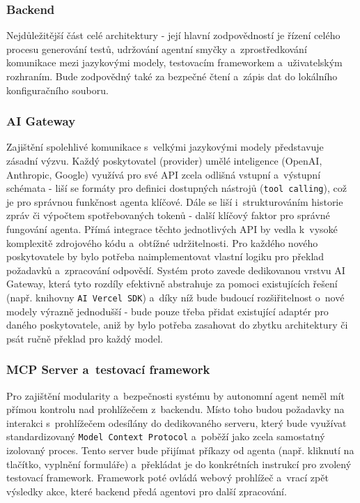 \documentclass[czech, ing, kiv, he, iso690numb, viewonly]{fasthesis}
\begin{document}
\subsubsection*{Backend}
Nejdůležitější část celé architektury - její hlavní zodpovědností je řízení celého procesu generování testů, udržování agentní smyčky a~zprostředkování komunikace mezi jazykovými modely, testovacím frameworkem a~uživatelským rozhraním. 
Bude zodpovědný také za bezpečné čtení a~zápis dat do lokálního konfiguračního souboru.

\subsubsection*{AI Gateway}
Zajištění spolehlivé komunikace s~velkými jazykovými modely představuje zásadní výzvu. Každý poskytovatel (provider) 
umělé inteligence (OpenAI, Anthropic, Google) využívá pro své API zcela odlišná vstupní a~výstupní schémata - 
liší se formáty pro definici dostupných nástrojů (\texttt{tool calling}), což je pro správnou funkčnost agenta klíčové.
Dále se liší i~strukturováním historie zpráv či výpočtem spotřebovaných tokenů - další klíčový faktor pro správné fungování agenta.
Přímá integrace těchto jednotlivých API by vedla k~vysoké komplexitě zdrojového kódu a~obtížné udržitelnosti.
Pro každého nového poskytovatele by bylo potřeba naimplementovat vlastní logiku pro překlad požadavků a~zpracování odpovědí.
Systém proto zavede dedikovanou vrstvu AI Gateway, která tyto rozdíly efektivně abstrahuje za pomoci existujících řešení
(např. knihovny \texttt{AI Vercel SDK}) a~díky níž bude budoucí rozšiřitelnost o~nové modely výrazně jednodušší - 
bude pouze třeba přidat existující adaptér pro daného poskytovatele, aniž by bylo potřeba zasahovat do zbytku architektury či 
psát ručně překlad pro každý model.


\subsubsection*{MCP Server a~testovací framework}
Pro zajištění modularity a~bezpečnosti systému by autonomní agent neměl mít přímou kontrolu nad prohlížečem z~backendu.
Místo toho budou požadavky na interakci s~prohlížečem odesílány do dedikovaného serveru, který bude využívat
standardizovaný \texttt{Model Context Protocol} a~poběží jako zcela samostatný izolovaný proces. 
Tento server bude přijímat příkazy od agenta (např. kliknutí na tlačítko, vyplnění formuláře) a~překládat 
je do konkrétních instrukcí pro zvolený testovací framework. Framework poté ovládá webový prohlížeč a~vrací zpět výsledky akce,
které backend předá agentovi pro další zpracování.
\end{document}
